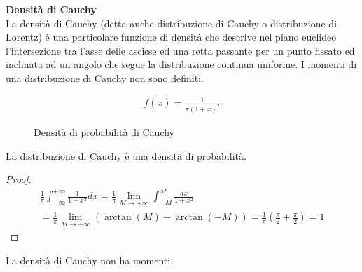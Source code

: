 \begin{defn}
    \textbf{Densità di Cauchy} \\
    La densità di Cauchy (detta anche distribuzione di Cauchy o distribuzione di
    Lorentz) è una particolare funzione di densità che descrive nel piano
    euclideo l'intersezione tra l'asse delle ascisse ed una retta passante per
    un punto fissato ed inclinata ad un angolo che segue la distribuzione
    continua uniforme. I momenti di una distribuzione di Cauchy non sono
    definiti.

    \begin{equation*}
        \begin{aligned}
            f(x) = \frac{1}{\pi (1+x)^2}
        \end{aligned}
    \end{equation*}


    \begin{figure}[htbp!]
        \centering

        \caption{Densità di probabilità di Cauchy}
        \label{cauchy}
    \end{figure}


    \begin{prop}
        La distribuzione di Cauchy è una densità di probabilità.
    \end{prop}

    \begin{proof}
        \begin{equation*}
            \begin{aligned}
                \frac{1}{\pi} \int_{-\infty}^{+\infty} \frac{1}{1 + x^2} dx = \frac{1}{\pi} \lim_{M \to +\infty} \int_{-M}^{M} \frac{dx}{1 + x^2} \\
                = \frac{1}{\pi} \lim_{M \to +\infty} \left( \arctan(M) - \arctan(-M) \right) = \frac{1}{\pi} \left( \frac{\pi}{2} + \frac{\pi}{2} \right) = 1
            \end{aligned}
        \end{equation*}
    \end{proof}

    \begin{prop}
        La densità di Cauchy non ha momenti.
    \end{prop}


\end{defn}
